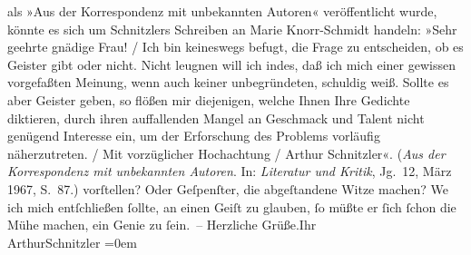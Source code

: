 \begin{ledgroupsized}[t]{13cm}
{{{                  als »Aus der Korrespondenz mit unbekannten Autoren« veröffentlicht wurde, könnte
                  es sich um Schnitzlers Schreiben an Marie Knorr-Schmidt handeln: »Sehr
                        geehrte gnädige Frau!{ / }Ich bin keineswegs befugt, die Frage zu entscheiden, ob es Geister gibt oder
                        nicht. Nicht leugnen will ich indes, daß ich mich einer gewissen vorgefaßten
                        Meinung, wenn auch keiner unbegründeten, schuldig weiß. Sollte es aber
                        Geister geben, so flößen mir diejenigen, welche Ihnen Ihre Gedichte
                        diktieren, durch ihren auffallenden Mangel an Geschmack und Talent nicht
                        genügend Interesse ein, um der Erforschung des Problems vorläufig
                        näherzutreten.{ / }Mit vorzüglicher Hochachtung{ / }Arthur Schnitzler«. (\emph{Aus der
                        Korrespondenz mit unbekannten Autoren}. In: \emph{Literatur und Kritik}, Jg. 12, März 1967,
                     S. 87.)}}}\label{K_L01363-1h} vorſtellen? Oder Geſpenſter, die abgeſtandene Witze
               machen? We{\geminationn} ich mich entſchließen ſollte, an einen Geiſt
               zu glauben, ſo müßte er ſich ſchon die Mühe machen, ein Genie zu ſein. –\pend
           \pstart
           Herzliche Grüße.\hspace*{1.5em}Ihr{\\[\baselineskip]}\spacefill\mbox{ArthurSchnitzler}\pend
           \leftskip=0em{}          \endnumbering{}\end{ledgroupsized}  \newcommand{\dateiname}{L01363}\newcommand{\titel}{Arthur Schnitzler an Michael Georg Conrad, 24. 1. 1904}\newcommand{\editorInnen}{Martin Anton Müller und Gerd-Hermann Susen}
            \footnotesize
\begin{ledgroupsized}[t]{11.5cm}
\end{ledgroupsized}
         
      